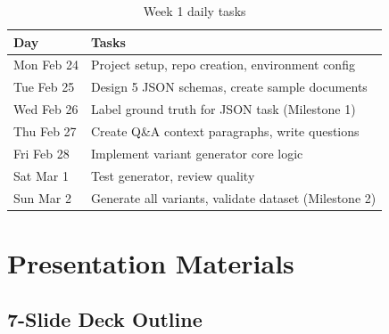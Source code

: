 \documentclass[11pt,a4paper]{article}
\begin{document}
\begin{table}[h]
\centering
\small
\begin{tabular}{@{}lp{10cm}@{}}
\toprule
\textbf{Day} & \textbf{Tasks} \\ \midrule
Mon Feb 24 & Project setup, repo creation, environment config \\
Tue Feb 25 & Design 5 JSON schemas, create sample documents \\
Wed Feb 26 & Label ground truth for JSON task (Milestone 1) \\
Thu Feb 27 & Create Q\&A context paragraphs, write questions \\
Fri Feb 28 & Implement variant generator core logic \\
Sat Mar 1 & Test generator, review quality \\
Sun Mar 2 & Generate all variants, validate dataset (Milestone 2) \\ \bottomrule
\end{tabular}
\caption{Week 1 daily tasks}
\end{table}

\section{Presentation Materials}

\subsection{7-Slide Deck Outline}
\end{document}
